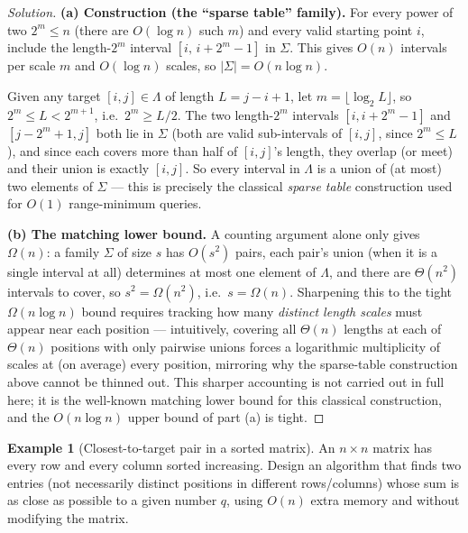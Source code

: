 \documentclass[11pt]{article}
\theoremstyle{definition}
\newtheorem{example}{Example}[section]
\begin{document}
\begin{proof}[Solution]
\textbf{(a) Construction (the ``sparse table'' family).} For every power of two $2^m\le n$ (there are $O(\log n)$ such $m$) and every valid starting point $i$, include the length-$2^m$ interval $[i,\,i+2^m-1]$ in $\Sigma$. This gives $O(n)$ intervals per scale $m$ and $O(\log n)$ scales, so $|\Sigma|=O(n\log n)$.

Given any target $[i,j]\in\Lambda$ of length $L=j-i+1$, let $m=\lfloor\log_2 L\rfloor$, so $2^m\le L<2^{m+1}$, i.e.\ $2^m\ge L/2$. The two length-$2^m$ intervals $[i,i+2^m-1]$ and $[j-2^m+1,j]$ both lie in $\Sigma$ (both are valid sub-intervals of $[i,j]$, since $2^m\le L$), and since each covers more than half of $[i,j]$'s length, they overlap (or meet) and their union is exactly $[i,j]$. So every interval in $\Lambda$ is a union of (at most) two elements of $\Sigma$ — this is precisely the classical \emph{sparse table} construction used for $O(1)$ range-minimum queries.

\textbf{(b) The matching lower bound.} A counting argument alone only gives $\Omega(n)$: a family $\Sigma$ of size $s$ has $O(s^2)$ pairs, each pair's union (when it is a single interval at all) determines at most one element of $\Lambda$, and there are $\Theta(n^2)$ intervals to cover, so $s^2=\Omega(n^2)$, i.e.\ $s=\Omega(n)$. Sharpening this to the tight $\Omega(n\log n)$ bound requires tracking how many \emph{distinct length scales} must appear near each position — intuitively, covering all $\Theta(n)$ lengths at each of $\Theta(n)$ positions with only pairwise unions forces a logarithmic multiplicity of scales at (on average) every position, mirroring why the sparse-table construction above cannot be thinned out. This sharper accounting is not carried out in full here; it is the well-known matching lower bound for this classical construction, and the $O(n\log n)$ upper bound of part (a) is tight.
\end{proof}

\begin{example}[Closest-to-target pair in a sorted matrix]
An $n\times n$ matrix has every row and every column sorted increasing. Design an algorithm that finds two entries (not necessarily distinct positions in different rows/columns) whose sum is as close as possible to a given number $q$, using $O(n)$ extra memory and without modifying the matrix.
\end{example}
\end{document}
